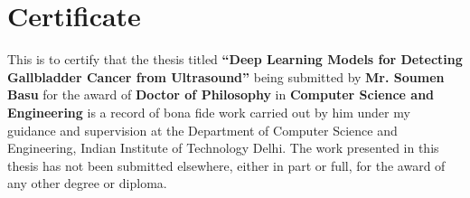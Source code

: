 
\chapter*{Certificate}

This is  to certify that  the thesis titled 
\textbf{``Deep Learning Models for Detecting Gallbladder Cancer from Ultrasound''}
being   submitted  by   \textbf{Mr. Soumen Basu}  for   the  award   of
\textbf{Doctor of Philosophy} in \textbf{Computer Science and Engineering} is
a record of bona fide work carried out by him under my guidance and
supervision at the Department of Computer Science and Engineering, Indian Institute of Technology Delhi.
The work presented in this thesis has not been submitted elsewhere, either in part or full, for the award of
any other degree or diploma.

\vspace {10 pc}


\begin{flushright}
 \\
 \\
\\
 \\

\end{flushright}


